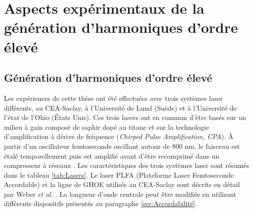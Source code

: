 


\chapter{Aspects expérimentaux de la génération d'harmoniques d'ordre élevé}
\label{chap:ExpHHG}
\section{Génération d'harmoniques d'ordre élevé}
\label{sec:HHG}
Les expériences de cette thèse ont été effectuées avec trois systèmes laser différents, au CEA-Saclay, à l'Université de Lund (Suède) et à l'Université de l'état de l'Ohio (\'{E}tats Unis). Ces trois lasers ont en commun d'être basés sur un milieu à gain composé de saphir dopé au titane et sur la technologie d'amplification à dérive de fréquence (\textit{Chirped Pulse Amplification, CPA}). \`{A} partir d'un oscillateur femtoseconde oscillant autour de 800 nm, le faisceau est étalé temporellement puis est amplifié avant d'être recomprimé dans un compresseur à réseaux . Les caractéristiques des trois systèmes laser sont résumés dans le tableau \ref{tab:Lasers}. Le laser PLFA (Plateforme Laser Femtoseconde Accordable) et la ligne de GHOE utilisés au CEA-Saclay sont décrits en détail par Weber \textit{et al.} . La longueur d'onde centrale peut être modifiée en utilisant différents dispositifs présentés au paragraphe \ref{sec:Accordabilité}.

